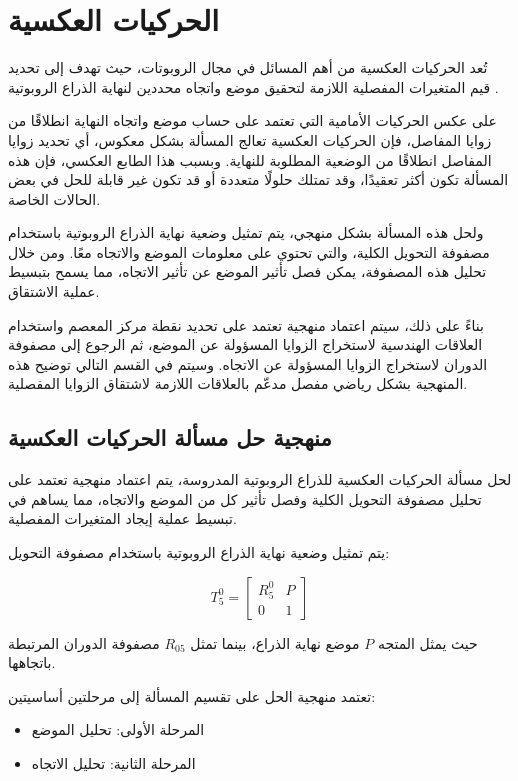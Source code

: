 \section{الحركيات العكسية}

تُعد الحركيات العكسية  من أهم المسائل في مجال الروبوتات، حيث تهدف إلى تحديد قيم المتغيرات المفصلية اللازمة لتحقيق موضع واتجاه محددين لنهاية الذراع الروبوتية .

على عكس الحركيات الأمامية  التي تعتمد على حساب موضع واتجاه النهاية انطلاقًا من زوايا المفاصل، فإن الحركيات العكسية تعالج المسألة بشكل معكوس، أي تحديد زوايا المفاصل انطلاقًا من الوضعية المطلوبة للنهاية. وبسبب هذا الطابع العكسي، فإن هذه المسألة تكون أكثر تعقيدًا، وقد تمتلك حلولًا متعددة أو قد تكون غير قابلة للحل في بعض الحالات الخاصة.

ولحل هذه المسألة بشكل منهجي، يتم تمثيل وضعية نهاية الذراع الروبوتية باستخدام مصفوفة التحويل الكلية، والتي تحتوي على معلومات الموضع والاتجاه معًا. ومن خلال تحليل هذه المصفوفة، يمكن فصل تأثير الموضع عن تأثير الاتجاه، مما يسمح بتبسيط عملية الاشتقاق.

بناءً على ذلك، سيتم اعتماد منهجية تعتمد على تحديد نقطة مركز المعصم  واستخدام العلاقات الهندسية لاستخراج الزوايا المسؤولة عن الموضع، ثم الرجوع إلى مصفوفة الدوران لاستخراج الزوايا المسؤولة عن الاتجاه. وسيتم في القسم التالي توضيح هذه المنهجية بشكل رياضي مفصل مدعّم بالعلاقات اللازمة لاشتقاق الزوايا المفصلية.


\subsection{منهجية حل مسألة الحركيات العكسية}

لحل مسألة الحركيات العكسية للذراع الروبوتية المدروسة، يتم اعتماد منهجية تعتمد على تحليل مصفوفة التحويل الكلية وفصل تأثير كل من الموضع والاتجاه، مما يساهم في تبسيط عملية إيجاد المتغيرات المفصلية.

يتم تمثيل وضعية نهاية الذراع الروبوتية باستخدام مصفوفة التحويل:

\[
T_5^0 =
\begin{bmatrix}
R_5^0 & P \\
0 & 1
\end{bmatrix}
\]

حيث يمثل المتجه \(P\) موضع نهاية الذراع، بينما تمثل \(R_{05}\) مصفوفة الدوران المرتبطة باتجاهها.

تعتمد منهجية الحل على تقسيم المسألة إلى مرحلتين أساسيتين:

\begin{itemize}
\item المرحلة الأولى: تحليل الموضع 
\item المرحلة الثانية: تحليل الاتجاه 
\end{itemize}

